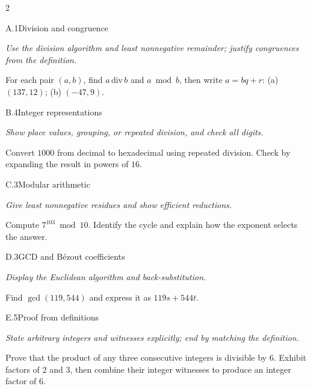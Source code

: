 \documentclass[9pt]{extarticle}
\begin{document}
\begin{multicols}{2}
\begin{CoreProblem}{A.1}{Division and congruence}
{\scriptsize\textit{Use the division algorithm and least nonnegative remainder; justify congruences from the definition.}\par}
For each pair $(a,b)$, find $a\,\mathrm{div}\,b$ and $a\bmod b$, then write
$a=bq+r$: (a) $(137,12)$; (b) $(-47,9)$.
\end{CoreProblem}
\begin{CoreProblem}{B.4}{Integer representations}
{\scriptsize\textit{Show place values, grouping, or repeated division, and check all digits.}\par}
Convert $1000$ from decimal to hexadecimal using repeated division. Check by
expanding the result in powers of $16$.
\end{CoreProblem}
\begin{CoreProblem}{C.3}{Modular arithmetic}
{\scriptsize\textit{Give least nonnegative residues and show efficient reductions.}\par}
Compute $7^{103}\bmod10$. Identify the cycle and explain how the exponent
selects the answer.
\end{CoreProblem}
\columnbreak
\begin{CoreProblem}{D.3}{GCD and B\'ezout coefficients}
{\scriptsize\textit{Display the Euclidean algorithm and back-substitution.}\par}
Find $\gcd(119,544)$ and express it as $119s+544t$.
\end{CoreProblem}
\begin{CoreProblem}{E.5}{Proof from definitions}
{\scriptsize\textit{State arbitrary integers and witnesses explicitly; end by matching the definition.}\par}
Prove that the product of any three consecutive integers is divisible by $6$.
Exhibit factors of $2$ and $3$, then combine their integer witnesses to
produce an integer factor of $6$.
\end{CoreProblem}
\end{multicols}
\CoreWorkArea
\FormBreak
{}
\end{document}
